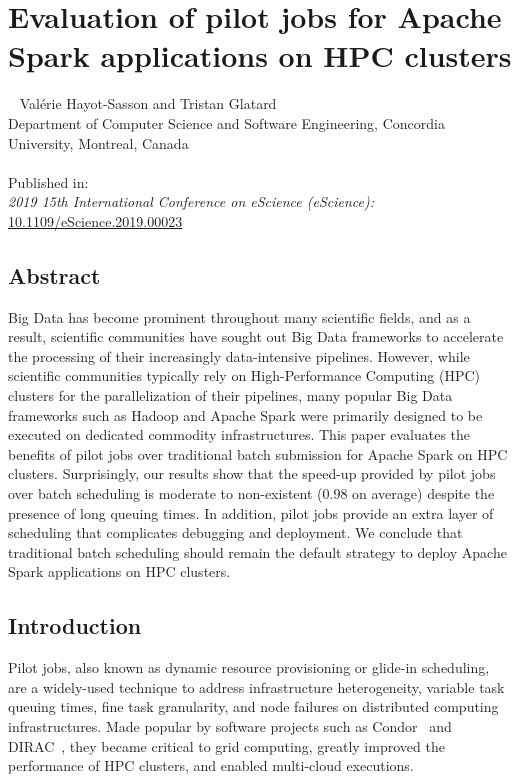 \chapter{Evaluation of pilot jobs for Apache Spark applications on HPC clusters}~\label{chp:spa}
Val\'erie Hayot-Sasson and Tristan Glatard \\
\begingroup \footnotesize
Department of Computer Science and Software Engineering, Concordia University, Montreal, Canada \\
\endgroup 
\vspace{5pt} \\
Published in: \\
\hspace*{10pt} \textit{2019 15th International Conference on eScience (eScience):} \url{10.1109/eScience.2019.00023}


\section{Abstract}
	Big Data has become prominent throughout many scientific fields, and as
	a result, scientific communities have sought out Big Data frameworks to
	accelerate the processing of their increasingly data-intensive
	pipelines. However, while scientific communities typically rely on
	High-Performance Computing (HPC) clusters for the parallelization of
	their pipelines, many popular Big Data frameworks such as Hadoop and
	Apache Spark were primarily designed to be executed on dedicated
	commodity infrastructures. This paper evaluates the benefits of pilot
	jobs over traditional batch submission for Apache Spark on HPC
	clusters. Surprisingly, our results show that the speed-up provided by
	pilot jobs over batch scheduling is moderate to non-existent (0.98 on
	average) despite the presence of long queuing times. In addition, pilot
	jobs provide an extra layer of scheduling that complicates debugging
	and deployment. We conclude that traditional batch scheduling should
	remain the default strategy to deploy Apache Spark applications on
	HPC clusters.
    
    
    \section{Introduction}
    
    Pilot jobs, also known as dynamic resource provisioning or glide-in
    scheduling, are a widely-used technique to address infrastructure
    heterogeneity, variable task queuing times, fine task granularity, and node
    failures on distributed computing infrastructures. Made popular by software
    projects such as Condor~\cite{thain2005distributed} and DIRAC~\cite{casajus2010dirac}, they
    became critical to grid computing, greatly improved the performance of HPC
    clusters, and enabled multi-cloud executions. 
    
